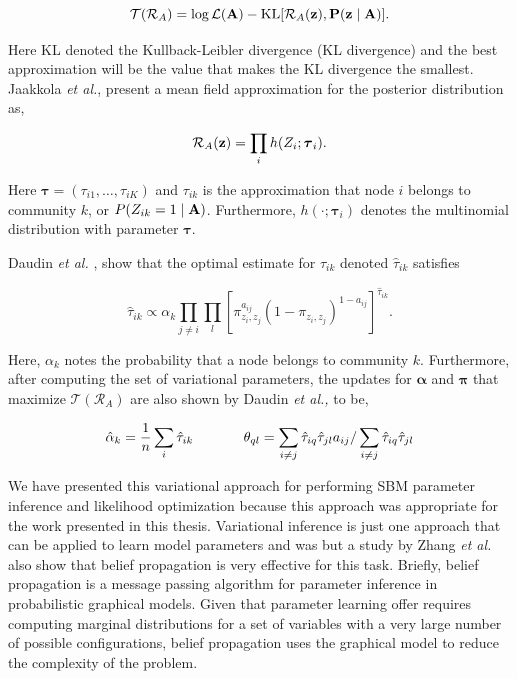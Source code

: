 \begin{equation}
\mathcal{T}(\mathcal{R}_{A})=\log \mathcal{L}({\bf A})-\text{KL}[\mathcal{R}_{A}(\bf z), P({\bf z} \mid {\bf A})].
\end{equation}

Here KL denoted the Kullback-Leibler divergence (KL divergence) and the best approximation will be the value that makes the KL divergence the smallest. Jaakkola \emph{et al.}, present a mean field approximation for the posterior distribution \cite{jakk} as,

\begin{equation}
\mathcal{R}_{A}({\bf z})=\prod_{i}h(Z_{i};{\boldsymbol \tau}_{i}).
\end{equation}

Here ${\boldsymbol \tau}=(\tau_{i1}, \dots, \tau_{iK})$ and $\tau_{ik}$ is the approximation that node $i$ belongs to community $k$, or $P(Z_{ik}=1 \mid {\bf A})$. Furthermore, $h(\cdot;{\boldsymbol \tau}_{i})$ denotes the multinomial distribution with parameter ${\boldsymbol \tau}$. 

Daudin \emph{et al.}  \cite{dudin} , show that the optimal estimate for $\tau_{ik}$ denoted $\hat{\tau}_{ik}$ satisfies

\begin{equation}
\hat{\tau}_{ik} \propto \alpha_{k}\prod_{j \ne i}\prod_{l}[\pi_{z_{i},z_{j}}^{a_{ij}}(1-\pi_{z_{i},z_{j}})^{1-a_{ij}}]^{\hat{\tau}_{ik}}.
\end{equation}

Here, $\alpha_{k}$ notes the probability that a node belongs to community $k$. Furthermore, after computing the set of variational parameters, the updates for ${\boldsymbol \alpha}$ and ${\boldsymbol \pi}$ that maximize $\mathcal{T}(\mathcal{R}_{A})$ are also shown by Daudin \emph{et al.,} \cite{dudin} to be,

\begin{equation}
\hat{\alpha}_{k}=\frac{1}{n}\sum_{i}\hat{\tau}_{ik}  \hspace{.5in}  {\theta}_{ql}=\sum_{i \ne j}\hat{\tau}_{iq}\hat{\tau}_{jl}a_{ij}/\sum_{i \ne j}\hat{\tau}_{iq}\hat{\tau}_{jl}
\end{equation}

We have presented this variational approach for performing SBM parameter inference and likelihood optimization because this approach was appropriate for the work presented in this thesis. Variational inference is just one approach that can be applied to learn model parameters and was but a study by  Zhang \emph{et al.} \cite{comp} also show that belief propagation \cite{belief} is very effective for this task. Briefly, belief propagation is a message passing algorithm for parameter inference in probabilistic graphical models. Given that parameter learning offer requires computing marginal distributions for a set of variables with a very large number of possible configurations, belief propagation uses the graphical model to reduce the complexity of the problem.  

